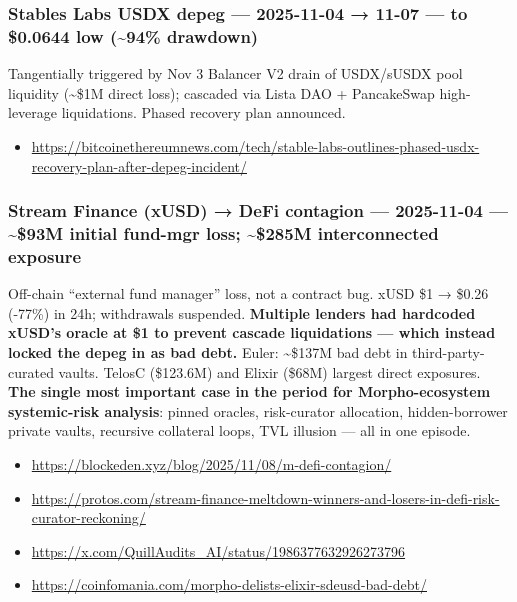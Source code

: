 \subsubsection{Stables Labs USDX depeg --- 2025-11-04 → 11-07 --- to \$0.0644 low (\textasciitilde94\% drawdown)}\label{stables-labs-usdx-depeg-2025-11-04-11-07-to-0.0644-low-94-drawdown}

Tangentially triggered by Nov 3 Balancer V2 drain of USDX/sUSDX pool liquidity (\textasciitilde\$1M direct loss); cascaded via Lista DAO + PancakeSwap high-leverage liquidations. Phased recovery plan announced.

\begin{itemize}
\tightlist
\item
  \url{https://bitcoinethereumnews.com/tech/stable-labs-outlines-phased-usdx-recovery-plan-after-depeg-incident/}
\end{itemize}

\subsubsection{Stream Finance (xUSD) → DeFi contagion --- 2025-11-04 --- \textasciitilde\$93M initial fund-mgr loss; \textasciitilde\$285M interconnected exposure}\label{stream-finance-xusd-defi-contagion-2025-11-04-93m-initial-fund-mgr-loss-285m-interconnected-exposure}

Off-chain ``external fund manager'' loss, not a contract bug. xUSD \$1 → \$0.26 (-77\%) in 24h; withdrawals suspended. \textbf{Multiple lenders had hardcoded xUSD's oracle at \$1 to prevent cascade liquidations --- which instead locked the depeg in as bad debt.} Euler: \textasciitilde\$137M bad debt in third-party-curated vaults. TelosC (\$123.6M) and Elixir (\$68M) largest direct exposures. \textbf{The single most important case in the period for Morpho-ecosystem systemic-risk analysis}: pinned oracles, risk-curator allocation, hidden-borrower private vaults, recursive collateral loops, TVL illusion --- all in one episode.

\begin{itemize}
\tightlist
\item
  \url{https://blockeden.xyz/blog/2025/11/08/m-defi-contagion/}
\item
  \url{https://protos.com/stream-finance-meltdown-winners-and-losers-in-defi-risk-curator-reckoning/}
\item
  \url{https://x.com/QuillAudits_AI/status/1986377632926273796}
\item
  \url{https://coinfomania.com/morpho-delists-elixir-sdeusd-bad-debt/}
\end{itemize}

